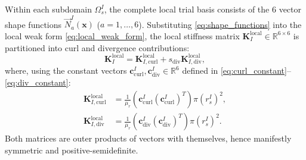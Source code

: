 \documentclass[preprint,12pt]{elsarticle}
\begin{document}
Within each subdomain $\Omega_s^I$, the complete local trial basis consists of the 6 vector shape functions $\vec{N}_a^I(\mathbf{x})$ ($a=1,\dots,6$). Substituting \eqref{eq:shape_functions} into the local weak form \eqref{eq:local_weak_form}, the local stiffness matrix $\mathbf{K}_I^{\mathrm{local}} \in \mathbb{R}^{6 \times 6}$ is partitioned into curl and divergence contributions:
\begin{equation}
    \mathbf{K}_I^{\mathrm{local}} = \mathbf{K}_{I, \mathrm{curl}}^{\mathrm{local}} + s_{\mathrm{div}} \mathbf{K}_{I, \mathrm{div}}^{\mathrm{local}},
\end{equation}
where, using the constant vectors $\mathbf{c}_{\mathrm{curl}}^I, \mathbf{c}_{\mathrm{div}}^I \in \mathbb{R}^6$ defined in \eqref{eq:curl_constant}--\eqref{eq:div_constant}:
\begin{align}
    \mathbf{K}_{I, \mathrm{curl}}^{\mathrm{local}} & = \frac{1}{\mu_r} \left( \mathbf{c}_{\mathrm{curl}}^I (\mathbf{c}_{\mathrm{curl}}^I)^T \right) \pi (r_s^I)^2, \label{eq:k_curl_analytic} \\
    \mathbf{K}_{I, \mathrm{div}}^{\mathrm{local}}  & = \frac{1}{\mu_r} \left( \mathbf{c}_{\mathrm{div}}^I (\mathbf{c}_{\mathrm{div}}^I)^T \right) \pi (r_s^I)^2. \label{eq:k_div_analytic}
\end{align}
Both matrices are outer products of vectors with themselves, hence manifestly symmetric and positive-semidefinite.
\end{document}
